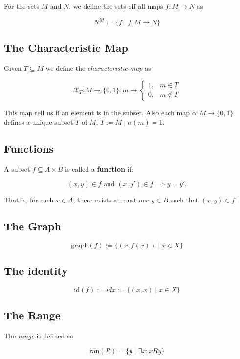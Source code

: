 For the sets \(M\) and \(N\), we define the sets off all maps \(f: M \to N\) as 

\[
	N^M := \{f \mid f: M \to N\}
\]

\subsection{The Characteristic Map}

Given \(T \subseteq M\) we define the \emph{characteristic map} as 

\[
	\mathcal{X}_T: M \to \{0,1\} : m \to \begin{cases} 
		1, &m \in T \\ 
		0, &m \notin T
	\end{cases}
\]

This map tell us if an element is in the subset. Also each map \(\alpha : M \to \{0, 1\}\) defines a 
unique subset \(T\) of \(M\), \(T := M \mid \alpha(m) = 1\).

\subsection{Functions} 

A subset \( f \subseteq A \times B \) is called a \textbf{function} if:

\[
	(x, y) \in f \text{ and } (x, y') \in f \implies y = y'.
\]

That is, for each \( x \in A \), there exists at most one \( y \in B \) such that \((x, y) \in f.\)

\subsection{The Graph}

\[
	\text{graph}(f):= \{(x, f(x)) \mid x \in X\}
\]

\subsection{The identity}

\[
	\text{id}(f):= idx:= \{(x, x)\mid x \in X\}
\]

\subsection{The Range}

The \emph{range}  is defined as 

\[
	\text{ran}(R) = \{y \mid \exists x: x R y\}
\]

